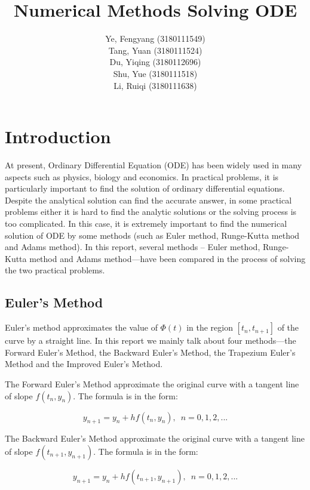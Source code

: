 \documentclass[a4paper]{article}
\title{\textbf{Numerical Methods Solving ODE}}
\author{
	Ye, Fengyang (3180111549) \\
	Tang, Yuan (3180111524)   \\
	Du, Yiqing (3180112696)   \\
	Shu, Yue (3180111518)     \\
	Li, Ruiqi (3180111638)
}
\begin{document}
	
	\maketitle
	
	\section{Introduction}
	
	At present, Ordinary Differential Equation (ODE) has been widely used in many aspects such as physics, biology and economics. In practical problems, it is particularly important to find the solution of ordinary differential equations. Despite the analytical solution can find the accurate answer, in some practical problems either it is hard to find the analytic solutions or the solving process is too complicated. In this case, it is extremely important to find the numerical solution of ODE by some methods (such as Euler method, Runge-Kutta method and Adams method). In this report, several methods -- Euler method, Runge-Kutta method and Adams method—have been compared in the process of solving the two practical problems.
	
	
	\subsection{Euler’s Method}
	
	Euler’s method approximates the value of $\Phi(t)$ in the region $[t_n, t_{n+1}]$ of the curve by a straight line. In this report we mainly talk about four methods—the Forward Euler’s Method, the Backward Euler’s Method, the Trapezium Euler’s Method and the Improved Euler’s Method.
	
	The Forward Euler’s Method approximate the original curve with a tangent line of slope $f(t_n, y_n)$. The formula is in the form:
	
	\begin{equation}\label{eq.1}
		y_{n+1} = y_n + hf(t_n, y_n), \enspace n = 0,1,2,...
	\end{equation}
	
	The Backward Euler’s Method approximate the original curve with a tangent line of slope $f(t_{n+1}, y_{n+1})$. The formula is in the form:
	
	\begin{equation}\label{eq.2}
		y_{n+1} = y_n + hf(t_{n+1}, y_{n+1}), \enspace n = 0,1,2,...
	\end{equation}	
	
\end{document}
